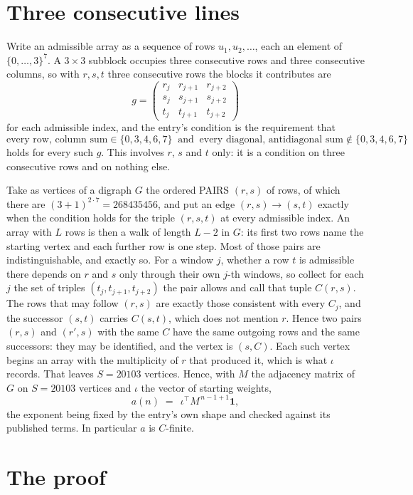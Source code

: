 \documentclass[11pt,a4paper]{article}
\theoremstyle{plain}
\theoremstyle{definition}
\begin{document}
\section{Three consecutive lines}

Write an admissible array as a sequence of rows $u_1,u_2,\dots$, each an element of
$\{0,\dots,3\}^{7}$. A $3\times3$ subblock occupies three consecutive rows and
three consecutive columns, so with $r,s,t$ three consecutive rows the blocks it
contributes are
\[
g=\begin{pmatrix}r_j&r_{j+1}&r_{j+2}\\ s_j&s_{j+1}&s_{j+2}\\ t_j&t_{j+1}&t_{j+2}\end{pmatrix}
\]
for each admissible index, and the entry's condition is the requirement that
\[
\text{every row, column sum} \in \{0,3,4,6,7\}\ \text{ and }\ \text{every diagonal, antidiagonal sum} \notin \{0,3,4,6,7\}
\]
holds for every such $g$. This involves $r$, $s$ and $t$ only: it is a condition on
three consecutive rows and on nothing else.

Take as vertices of a digraph $G$ the ordered PAIRS $(r,s)$ of rows, of which there are
$(3+1)^{2\cdot7}=268435456$, and put an edge $(r,s)\to(s,t)$ exactly when the condition
holds for the triple $(r,s,t)$ at every admissible index. An array with $L$ rows is then a
walk of length $L-2$ in $G$: its first two rows name the starting vertex and each further
row is one step. Most of those pairs are indistinguishable, and exactly so. For a window $j$, whether a row $t$ is admissible there depends on $r$ and $s$ only through their own $j$-th windows, so collect for each $j$ the set of triples $(t_j,t_{j+1},t_{j+2})$ the pair allows and call that tuple $C(r,s)$. The rows that may follow $(r,s)$ are exactly those consistent with every $C_j$, and the successor $(s,t)$ carries $C(s,t)$, which does not mention $r$. Hence two pairs $(r,s)$ and $(r',s)$ with the same $C$ have the same outgoing rows and the same successors: they may be identified, and the vertex is $(s,C)$. Each such vertex begins an array with the multiplicity of $r$ that produced it, which is what $\iota$ records. That leaves $S=20103$ vertices. Hence, with $M$ the adjacency matrix of $G$ on $S=20103$ vertices and
$\iota$ the vector of starting weights,
\[
a(n)\;=\;\,\iota^{\!\top}M^{\,n-1+1}\mathbf{1},
\]
the exponent being fixed by the entry's own shape and checked against its published terms.
In particular $a$ is $C$-finite.

\section{The proof}
\end{document}
